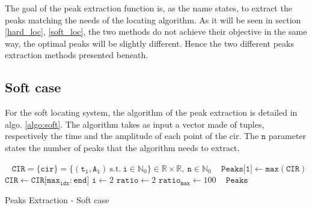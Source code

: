 The goal of the peak extraction function is, as the name states, to extract the peaks matching the needs of the locating algorithm. As it will be seen in section \ref{hard_loc}, \ref{soft_loc}, the two methods do not achieve their objective in the same way, the optimal peaks will be slightly different. Hence the two different peaks extraction methods presented beneath.

\subsection{Soft case}

For the soft locating system, the algorithm of the peak extraction is detailed in algo. \ref{algo:soft}. The algorithm takes as input a vector made of tuples, respectively the time and the amplitude of each point of the \gls{cir}. The $\texttt{n}$ parameter states the number of peaks that the algorithm needs to extract.
\vspace{2mm}


\begin{algorithm}[H]
 \KwInput{}\
 \hspace*{\algorithmicindent} $\mathtt{CIR} = \{\mathtt{cir}\} = \{ (\mathtt{t_i}, \mathtt{A_i}) ~\text{s.t.} ~\mathtt{i} \in \mathbb{N}_0\} \in \mathbb{R} \times \mathbb{R}, ~\mathtt{n} \in \mathbb{N}_0$ \;
\KwInit{}\
\hspace*{\algorithmicindent} $\texttt{Peaks[1]} \longleftarrow \texttt{max}(\texttt{CIR})$\;
\hspace*{\algorithmicindent} $\texttt{CIR} \longleftarrow \texttt{CIR[}\texttt{max}_{\texttt{idx}}:\texttt{end]}$\;
\hspace*{\algorithmicindent} $\texttt{i} \longleftarrow 2$\;
\hspace*{\algorithmicindent} $\texttt{ratio} \longleftarrow 2$\;
\hspace*{\algorithmicindent} $\texttt{ratio}_\texttt{max} \longleftarrow 100$\;
 \KwOutput{}\
 \hspace*{\algorithmicindent} $\texttt{Peaks}$\;
 \caption{Peaks Extraction - Soft case \label{algo:soft}}
\end{algorithm}

